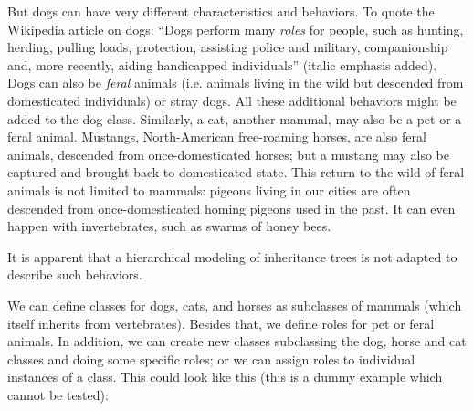 But dogs can have very different characteristics and behaviors.
To quote the Wikipedia article on dogs: ``Dogs perform many 
\emph{roles} for people, such as hunting, herding, pulling 
loads, protection, assisting police and military, companionship 
and, more recently, aiding handicapped individuals'' (italic emphasis 
added). Dogs can also be \emph{feral} animals 
(i.e. animals living in the wild but 
descended from domesticated individuals) or stray dogs. All 
these additional behaviors might be added to the dog class. 
Similarly, a cat, another mammal, may also be a pet 
or a feral animal. Mustangs, North-American free-roaming horses, 
are also feral animals, descended from once-domesticated horses; 
but a mustang may also be captured and brought back to 
domesticated state. This return to the wild of feral animals 
is not limited to mammals: pigeons living in our cities are 
often descended from once-domesticated homing pigeons used 
in the past. It can even happen with invertebrates, such 
as swarms of honey bees.

It is apparent that a hierarchical modeling of inheritance 
trees is not adapted to describe such behaviors. 

  
We can define classes for dogs, cats, and horses as subclasses 
of mammals (which itself inherits from vertebrates). Besides 
that, we define roles for pet or feral animals. In addition, 
we can create new classes subclassing the dog, horse and cat 
classes and doing some specific roles; or we can assign roles 
to individual instances of a class. This could look like this 
(this is a dummy example which cannot be tested):

